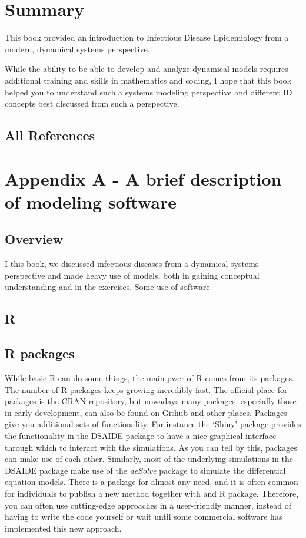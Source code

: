 \documentclass[]{book}
\theoremstyle{definition}
\theoremstyle{definition}
\theoremstyle{definition}
\theoremstyle{remark}
\begin{document}
\chapter{Summary}\label{summary}

This book provided an introduction to Infectious Disease Epidemiology
from a modern, dynamical systems perspective.

While the ability to be able to develop and analyze dynamical models
requires additional training and skills in mathematics and coding, I
hope that this book helped you to understand such a systems modeling
perspective and different ID concepts best discussed from such a
perspective.

\section{All References}\label{all-references}

\chapter{Appendix A - A brief description of modeling
software}\label{appendix-a---a-brief-description-of-modeling-software}

\section{Overview}\label{overview}

I this book, we discussed infectious diseases from a dynamical systems
perspective and made heavy use of models, both in gaining conceptual
understanding and in the exercises. Some use of software

\section{R}\label{r}

\section{R packages}\label{r-packages}

While basic R can do some things, the main pwer of R comes from its
packages. The number of R packages keeps growing incredibly fast. The
official place for packages is the CRAN repository, but nowadays many
packages, especially those in early development, can also be found on
Github and other places. Packages give you additional sets of
functionality. For instance the `Shiny' package provides the
functionality in the DSAIDE package to have a nice graphical interface
through which to interact with the simulations. As you can tell by this,
packages can make use of each other. Similarly, most of the underlying
simulations in the DSAIDE package make use of the \emph{deSolve} package
to simulate the differential equation models. There is a package for
almost any need, and it is often common for individuals to publish a new
method together with and R package. Therefore, you can often use
cutting-edge approaches in a user-friendly manner, instead of having to
write the code yourself or wait until some commercial software has
implemented this new approach.
\end{document}
